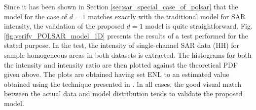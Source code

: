 \documentclass[journal]{IEEEtran}
\begin{document}
Since it has been shown in Section \ref{sec:sar_special_case_of_polsar} that the model for the case of $d=1$ matches exactly with the traditional model for SAR intensity,
  the validation of the proposed $d=1$ model is quite straightforward. %
Fig. \ref{fig:verify_POLSAR_model_1D} presents the results of a test performed for the stated purpose.
In the test, the intensity of single-channel SAR data (HH) for sample homogeneous areas in both datasets is extracted.
The histograms for both the intensity and intensity ratio %
  are then plotted against the theoretical PDF given above.
The plots are obtained having set ENL to an estimated value obtained using the technique presented in \cite{Anfinsen_2009_TGRS_3795}.
In all cases, the good visual match between the actual data and model distribution tends to validate the proposed model. %
\end{document}
